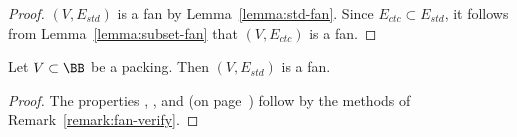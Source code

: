\begin{proof} 
  $(V,E_{std})$ is a fan by Lemma~\ref{lemma:std-fan}.  Since
  $E_{ctc}\subset E_{std}$, it follows from
  Lemma~\ref{lemma:subset-fan} that $(V,E_{ctc})$ is a fan.
\end{proof}


\begin{lemma}\label{lemma:std-fan} 
Let $V\subset \BB$ be a packing.  
Then $(V,E_{std})$ is a fan.
\end{lemma}

\begin{proof}
The properties , , and  (on page~\pageref{def:fan}) 
follow
by the methods of Remark~\ref{remark:fan-verify}.


\end{proof}
